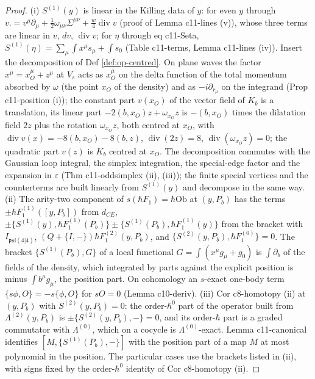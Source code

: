 \documentclass[11pt]{article}
\numberwithin{equation}{section}
\theoremstyle{plain}
\theoremstyle{definition}
\newcommand{\psl}{\mathfrak{psl}(4|4)}
\begin{document}
\begin{proof}
(i) $S^{(1)}(y)$ is linear in the Killing data of $y$: for even $y$ through $v.=v^\mu\partial_\mu+\tfrac12\omega_{\mu\nu}\Sigma^{\mu\nu}+\tfrac w4\operatorname{div}v$ (proof of Lemma c11-lines (v)), whose three terms are linear in $v$, $dv$, $\operatorname{div}v$; for $\eta$ through eq c11-Seta, $S^{(1)}(\eta)=\sum_\mu\int x^\mu s_\mu+\int s_0$ (Table c11-terms, Lemma c11-lines (iv)). Insert the decomposition of Def \ref{def:op-centred}. On plane waves the factor $x^\mu=x_O^\mu+z^\mu$ at $V_s$ acts as $x_O^\mu$ on the delta function of the total momentum absorbed by $\omega$ (the point $x_O$ of the density) and as $-i\partial_{r_\mu}$ on the integrand (Prop c11-position (i)); the constant part $v(x_O)$ of the vector field of $K_b$ is a translation, its linear part $-2(b,x_O)z+\omega_{x_O}z$ is $-(b,x_O)$ times the dilatation field $2z$ plus the rotation $\omega_{x_O}z$, both centred at $x_O$, with $\operatorname{div}v(x)=-8(b,x_O)-8(b,z)$, $\operatorname{div}(2z)=8$, $\operatorname{div}(\omega_{x_O}z)=0$; the quadratic part $v(z)$ is $K_b$ centred at $x_O$. The decomposition commutes with the Gaussian loop integral, the simplex integration, the special-edge factor and the expansion in $\varepsilon$ (Thm c11-oddsimplex (ii), (iii)); the finite special vertices and the counterterms are built linearly from $S^{(1)}(y)$ and decompose in the same way.
(ii) The arity-two component of $s(\hbar F_1)=\hbar\mathrm{Ob}$ at $(y,P_b)$ has the terms $\pm\hbar F_1^{(1)}([y,P_b])$ from $d_{CE}$, $\pm\{S^{(1)}(y),\hbar F_1^{(1)}(P_b)\}\pm\{S^{(1)}(P_b),\hbar F_1^{(1)}(y)\}$ from the bracket with $I_{\psl}$, $(Q+\{I,-\})\hbar F_1^{(2)}(y,P_b)$, and $\{S^{(2)}(y,P_b),\hbar F_1^{(0)}\}=0$. The bracket $\{S^{(1)}(P_b),G\}$ of a local functional $G=\int(x^\mu g_\mu+g_0)$ is $\int\partial_b$ of the fields of the density, which integrated by parts against the explicit position is minus $\int b^\mu g_\mu$, the position part. On cohomology an $s$-exact one-body term $\{s\phi,O\}=-s\{\phi,O\}$ for $sO=0$ (Lemma c10-deriv).
(iii) Cor c8-homotopy (ii) at $(y,P_b)$ with $S^{(2)}(y,P_b)=0$: the order-$\hbar^0$ part of the operator built from $\Lambda^{(2)}(y,P_b)$ is $\pm\{S^{(2)}(y,P_b),-\}=0$, and its order-$\hbar$ part is a graded commutator with $\Lambda^{(0)}$, which on a cocycle is $\Lambda^{(0)}$-exact. Lemma c11-canonical identifies $[M,\{S^{(1)}(P_b),-\}]$ with the position part of a map $M$ at most polynomial in the position. The particular cases use the brackets listed in (ii), with signs fixed by the order-$\hbar^0$ identity of Cor c8-homotopy (ii).
\end{proof}
\end{document}

